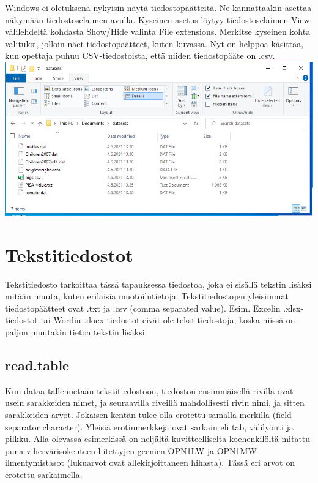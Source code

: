\documentclass[
]{book}
\begin{document}
Windows ei oletuksena nykyisin näytä tiedostopäätteitä. Ne kannattaakin asettaa näkymään tiedostoselaimen avulla. Kyseinen asetus löytyy tiedostoselaimen View-välilehdeltä kohdasta Show/Hide valinta File extensions. Merkitse kyseinen kohta valituksi, jolloin näet tiedostopäätteet, kuten kuvassa. Nyt on helppoa käsittää, kun opettaja puhuu CSV-tiedostoista, että niiden tiedostopääte on .csv.
\includegraphics{files/03-reading_data/windows_show_file_extensions2.png}

\hypertarget{tekstitiedostot}{%
\section{Tekstitiedostot}\label{tekstitiedostot}}

Tekstitiedosto tarkoittaa tässä tapauksessa tiedostoa, joka ei sisällä tekstin lisäksi mitään muuta, kuten erilaisia muotoilutietoja. Tekstitiedostojen yleisimmät tiedostopäätteet ovat .txt ja .csv (comma separated value). Esim. Excelin .xlsx-tiedostot tai Wordin .docx-tiedostot eivät ole tekstitiedostoja, koska niissä on paljon muutakin tietoa tekstin lisäksi.

\hypertarget{read.table}{%
\subsection{read.table}\label{read.table}}

Kun dataa tallennetaan tekstitiedostoon, tiedoston ensimmäisellä rivillä ovat usein sarakkeiden nimet, ja seuraavilla riveillä mahdollisesti rivin nimi, ja sitten sarakkeiden arvot. Jokaisen kentän tulee olla erotettu samalla merkillä (field separator character). Yleisiä erotinmerkkejä ovat sarkain eli tab, välilyönti ja pilkku. Alla olevassa esimerkissä on neljältä kuvitteelliselta koehenkilöltä mitattu puna-vihervärisokeuteen liitettyjen geenien OPN1LW ja OPN1MW ilmentymistasot (lukuarvot ovat allekirjoittaneen hihasta). Tässä eri arvot on erotettu sarkaimella.
\end{document}

